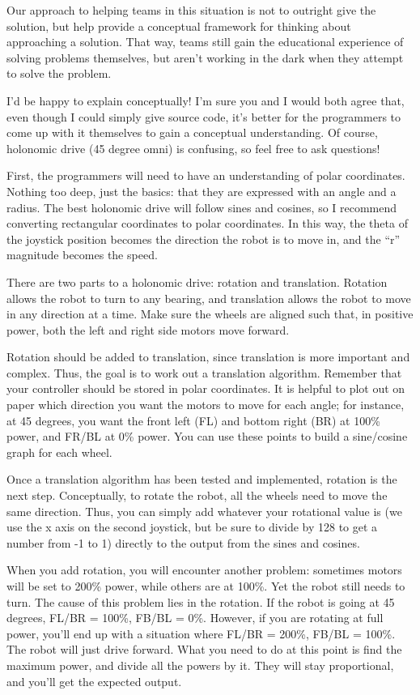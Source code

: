 Our approach to helping teams in this situation is not to outright give the solution, but help provide a conceptual framework for thinking about approaching a solution. That way, teams still gain the educational experience of solving problems themselves, but aren't working in the dark when they attempt to solve the problem.

\begin{fancyquotes}
I'd be happy to explain conceptually! I'm sure you and I would both agree that, even though I could simply give source code, it's better for the programmers to come up with it themselves to gain a conceptual understanding. Of course, holonomic drive (45 degree omni) is confusing, so feel free to ask questions!

First, the programmers will need to have an understanding of polar coordinates. Nothing too deep, just the basics: that they are expressed with an angle and a radius. The best holonomic drive will follow sines and cosines, so I recommend converting rectangular coordinates to polar coordinates. In this way, the theta of the joystick position becomes the direction the robot is to move in, and the ``r'' magnitude becomes the speed.

There are two parts to a holonomic drive: rotation and translation. Rotation allows the robot to turn to any bearing, and translation allows the robot to move in any direction at a time. Make sure the wheels are aligned such that, in positive power, both the left and right side motors move forward.

Rotation should be added to translation, since translation is more important and complex. Thus, the goal is to work out a translation algorithm. Remember that your controller should be stored in polar coordinates. It is helpful to plot out on paper which direction you want the motors to move for each angle; for instance, at 45 degrees, you want the front left (FL) and bottom right (BR) at 100\% power, and FR/BL at 0\% power. You can use these points to build a sine/cosine graph for each wheel. 

Once a translation algorithm has been tested and implemented, rotation is the next step. Conceptually, to rotate the robot, all the wheels need to move the same direction. Thus, you can simply add whatever your rotational value is (we use the x axis on the second joystick, but be sure to divide by 128 to get a number from -1 to 1) directly to the output from the sines and cosines.

When you add rotation, you will encounter another problem: sometimes motors will be set to 200\% power, while others are at 100\%. Yet the robot still needs to turn. The cause of this problem lies in the rotation. If the robot is going at 45 degrees, FL/BR = 100\%, FB/BL = 0\%. However, if you are rotating at full power, you'll end up with a situation where FL/BR = 200\%, FB/BL = 100\%. The robot will just drive forward. What you need to do at this point is find the maximum power, and divide all the powers by it. They will stay proportional, and you'll get the expected output.


\end{fancyquotes}
